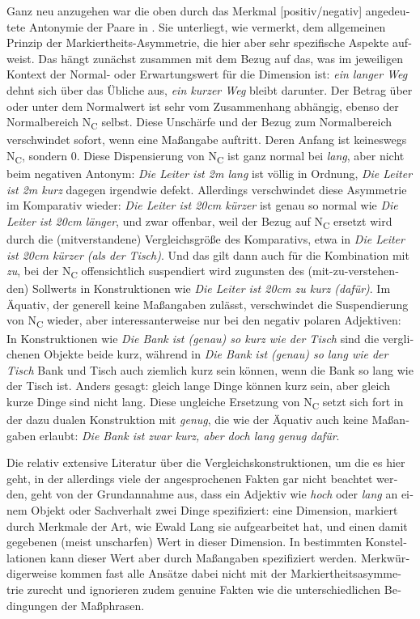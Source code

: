 \documentclass[output=paper,colorlinks,citecolor=brown]{langscibook}
\begin{document}
\begin{otherlanguage}{german}
Ganz neu anzugehen war die oben durch das Merkmal [positiv/negativ] angedeutete Antonymie der Paare in . Sie unterliegt, wie vermerkt, dem allgemeinen Prinzip der Markiertheits-Asymmetrie, die hier aber sehr spezifische Aspekte aufweist. Das hängt zunächst zusammen mit dem Bezug auf das, was im jeweiligen Kontext der Normal- oder Erwartungswert für die Dimension ist: \textit{ein langer Weg} dehnt sich über das Übliche aus, \textit{ein kurzer Weg} bleibt darunter. Der Betrag über oder unter dem Normalwert ist sehr vom Zusammenhang abhängig, ebenso der Normalbereich N\textsubscript{C} selbst. Diese Unschärfe und der Bezug zum Normalbereich verschwindet sofort, wenn eine Maßangabe auftritt. Deren Anfang ist keineswegs N\textsubscript{C}, sondern 0. Diese Dispensierung von N\textsubscript{C} ist ganz normal bei \textit{lang}, aber nicht beim negativen Antonym: \textit{Die Leiter ist 2m lang} ist völlig in Ordnung, \textit{Die Leiter ist 2m kurz} dagegen irgendwie defekt. Allerdings verschwindet diese Asymmetrie im Komparativ wieder: \textit{Die Leiter ist 20cm kürzer} ist genau so normal wie \textit{Die Leiter ist 20cm länger}, und zwar offenbar, weil der Bezug auf N\textsubscript{C} ersetzt wird durch die (mitverstandene) Vergleichsgröße des Komparativs, etwa in \textit{Die Leiter ist 20cm kürzer (als der Tisch)}. Und das gilt dann auch für die Kombination mit \textit{zu}, bei der N\textsubscript{C} offensichtlich suspendiert wird zugunsten des (mit-zu-verstehenden) Sollwerts in Konstruktionen wie \textit{Die Leiter ist 20cm zu kurz (dafür)}. Im Äquativ, der generell keine Maßangaben zulässt, verschwindet die Suspendierung von N\textsubscript{C} wieder, aber interessanterweise nur bei den negativ polaren Adjektiven: In Konstruktionen wie \textit{Die Bank ist (genau) so kurz wie der Tisch} sind die verglichenen Objekte beide kurz, während in \textit{Die Bank ist (genau) so lang wie der Tisch} Bank und Tisch auch ziemlich kurz sein können, wenn die Bank so lang wie der Tisch ist. Anders gesagt: gleich lange Dinge können kurz sein, aber gleich kurze Dinge sind nicht lang. Diese ungleiche Ersetzung von N\textsubscript{C} setzt sich fort in der dazu dualen Konstruktion mit \textit{genug}, die wie der Äquativ auch keine Maßangaben erlaubt: \textit{Die Bank ist zwar kurz, aber doch lang genug dafür}.

Die relativ extensive Literatur über die Vergleichskonstruktionen, um die es hier geht, in der allerdings viele der angesprochenen Fakten gar nicht beachtet werden, geht von der Grundannahme aus, dass ein Adjektiv wie \textit{hoch} oder \textit{lang} an einem Objekt oder Sachverhalt zwei Dinge spezifiziert: eine Dimension, markiert durch Merkmale der Art, wie Ewald Lang sie aufgearbeitet hat, und einen damit gegebenen (meist unscharfen) Wert in dieser Dimension. In bestimmten Konstellationen kann dieser Wert aber durch Maßangaben spezifiziert werden. Merkwürdigerweise kommen fast alle Ansätze dabei nicht mit der Markiertheitsasymmetrie zurecht und ignorieren zudem genuine Fakten wie die unterschiedlichen Bedingungen der Maßphrasen.


\end{otherlanguage}
\end{document}
